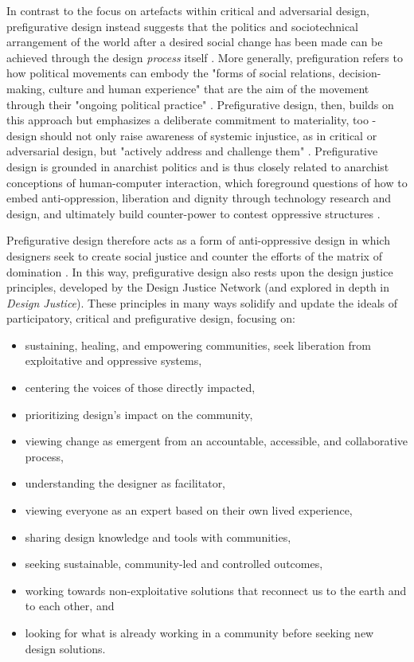 In contrast to the focus on artefacts within critical and adversarial design, prefigurative design instead suggests that the politics and sociotechnical arrangement of the world after a desired social change has been made can be achieved through the design \textit{process} itself \citep{asad_creating_2017}. More generally, prefiguration refers to how political movements can embody the "forms of social relations, decision-making, culture and human experience" that are the aim of the movement through their "ongoing political practice" \cite[7]{boggs_marxism_1977}. Prefigurative design, then, builds on this approach but emphasizes a deliberate commitment to materiality, too - design should not only raise awareness of systemic injustice, as in critical or adversarial design, but "actively address and challenge them" \citep{asad_prefigurative_2018}. Prefigurative design is grounded in anarchist politics and is thus closely related to anarchist conceptions of human-computer interaction, which foreground questions of how to embed anti-oppression, liberation and dignity through technology research and design, and ultimately build counter-power to contest oppressive structures \citep{keyes_human-computer_2019,asad_prefigurative_2019}. 

Prefigurative design therefore acts as a form of anti-oppressive design \citep{smyth_anti-oppressive_2014} in which designers seek to create social justice and counter the efforts of the matrix of domination \citep{collins_black_2002}. In this way, prefigurative design also rests upon the design justice principles, developed by the Design Justice Network (and explored in depth in \citet{costanza-chock_design_2020} \emph{Design Justice}). These principles in many ways solidify and update the ideals of participatory, critical and prefigurative design, focusing on: 
\begin{itemize}
\item sustaining, healing, and empowering communities, seek liberation from exploitative and oppressive systems,
\item centering the voices of those directly impacted,
\item prioritizing design's impact on the community,
\item viewing change as emergent from an accountable, accessible, and collaborative process,
\item understanding the designer as facilitator,
\item viewing everyone as an expert based on their own lived experience,
\item sharing design knowledge and tools with communities,
\item seeking sustainable, community-led and controlled outcomes,
\item working towards non-exploitative solutions that reconnect us to the earth and to each other, and
\item looking for what is already working in a community before seeking new design solutions.
\end{itemize}

